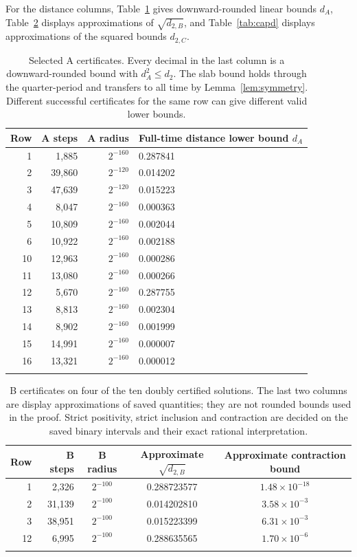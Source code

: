 \documentclass[10pt,a4paper]{article}
\theoremstyle{remark}
\begin{document}
For the distance columns, Table~\ref{tab:distances} gives downward-rounded
linear bounds $d_A$, Table~\ref{tab:second} displays approximations of
$\sqrt{d_{2,B}}$, and Table~\ref{tab:capd} displays approximations of
the squared bounds $d_{2,C}$.

\begin{longtable}{@{}rrrl@{}}
\toprule
Row & A steps & A radius & Full-time distance lower bound $d_A$\\
\midrule
1 & 1,885 & $2^{-160}$ & 0.287841\\
2 & 39,860 & $2^{-120}$ & 0.014202\\
3 & 47,639 & $2^{-120}$ & 0.015223\\
4 & 8,047 & $2^{-160}$ & 0.000363\\
5 & 10,809 & $2^{-160}$ & 0.002044\\
6 & 10,922 & $2^{-160}$ & 0.002188\\
10 & 12,963 & $2^{-160}$ & 0.000286\\
11 & 13,080 & $2^{-160}$ & 0.000266\\
12 & 5,670 & $2^{-160}$ & 0.287755\\
13 & 8,813 & $2^{-160}$ & 0.002304\\
14 & 8,902 & $2^{-160}$ & 0.001999\\
15 & 14,991 & $2^{-160}$ & 0.000007\\
16 & 13,321 & $2^{-160}$ & 0.000012\\
\bottomrule
\caption{Selected A certificates. Every decimal in the last column
is a downward-rounded bound with $d_A^2\le d_2$. The slab bound holds
through the quarter-period and transfers to all time by
Lemma~\ref{lem:symmetry}. Different successful certificates for the
same row can give different valid lower bounds.}
\label{tab:distances}
\end{longtable}

\begin{longtable}{@{}rrccc@{}}
\toprule
Row & B steps & B radius & Approximate $\sqrt{d_{2,B}}$ & Approximate contraction bound\\
\midrule
1 & 2,326 & $2^{-100}$ & 0.288723577 & $1.48\times10^{-18}$\\
2 & 31,139 & $2^{-100}$ & 0.014202810 & $3.58\times10^{-3}$\\
3 & 38,951 & $2^{-100}$ & 0.015223399 & $6.31\times10^{-3}$\\
12 & 6,995 & $2^{-100}$ & 0.288635565 & $1.70\times10^{-6}$\\
\bottomrule
\caption{B certificates on four of the ten doubly certified solutions. The
last two columns are display approximations of saved quantities;
they are not rounded bounds used in the proof. Strict positivity,
strict inclusion and contraction are decided on the saved binary
intervals and their exact rational interpretation.}
\label{tab:second}
\end{longtable}
\end{document}
